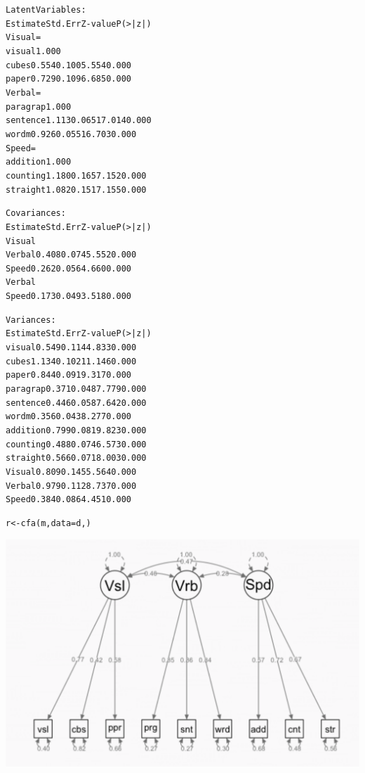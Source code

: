 \begin{alltt}
Latent Variables:
                   Estimate  Std.Err  Z-value  P(>|z|)
  Visual =~
    visual            1.000  \hfill {}
    cubes             0.554    0.100    5.554    0.000
    paper             0.729    0.109    6.685    0.000
  Verbal =~
    paragrap          1.000
    sentence          1.113    0.065   17.014    0.000
    wordm             0.926    0.055   16.703    0.000
  Speed =~
    addition          1.000
    counting          1.180    0.165    7.152    0.000
    straight          1.082    0.151    7.155    0.000

Covariances:
                   Estimate  Std.Err  Z-value  P(>|z|)
  Visual ~~
    Verbal            0.408    0.074    5.552    0.000 \hfill {}
    Speed             0.262    0.056    4.660    0.000
  Verbal ~~
    Speed             0.173    0.049    3.518    0.000

Variances:
                   Estimate  Std.Err  Z-value  P(>|z|)
    visual            0.549    0.114    4.833    0.000
    cubes             1.134    0.102   11.146    0.000
    paper             0.844    0.091    9.317    0.000
    paragrap          0.371    0.048    7.779    0.000
    sentence          0.446    0.058    7.642    0.000
    wordm             0.356    0.043    8.277    0.000
    addition          0.799    0.081    9.823    0.000
    counting          0.488    0.074    6.573    0.000
    straight          0.566    0.071    8.003    0.000
    Visual            0.809    0.145    5.564    0.000
    Verbal            0.979    0.112    8.737    0.000
    Speed             0.384    0.086    4.451    0.000
\end{alltt}



\begin{alltt}
r <- cfa(m, data = d, ) 
\end{alltt}


{\centering \includegraphics[width=.6\textwidth]{figs/m2.eps}\par}

